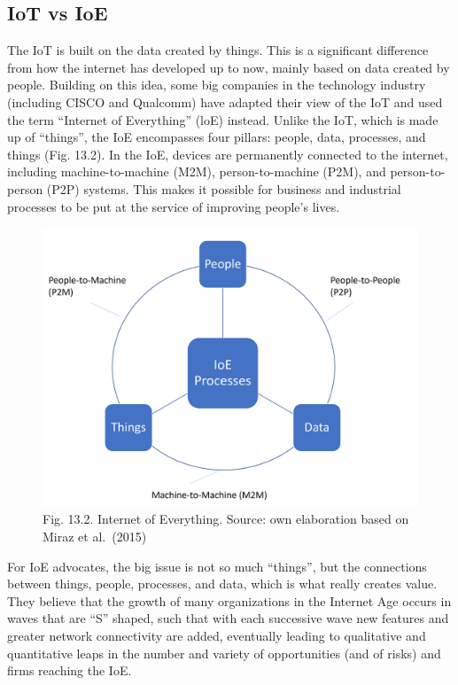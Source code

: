 \documentclass[
  letterpaper,
  DIV=11,
  numbers=noendperiod]{scrreprt}
\begin{document}
\hypertarget{iot-vs-ioe}{%
\subsection{IoT vs IoE}\label{iot-vs-ioe}}

The IoT is built on the data created by things. This is a significant
difference from how the internet has developed up to now, mainly based
on data created by people. Building on this idea, some big companies in
the technology industry (including CISCO and Qualcomm) have adapted
their view of the IoT and used the term ``Internet of Everything'' (loE)
instead. Unlike the IoT, which is made up of ``things'', the IoE
encompasses four pillars: people, data, processes, and things (Fig.
13.2). In the IoE, devices are permanently connected to the internet,
including machine-to-machine (M2M), person-to-machine (P2M), and
person-to-person (P2P) systems. This makes it possible for business and
industrial processes to be put at the service of improving people's
lives.

\begin{figure}

{\centering \includegraphics[width=6.25in,height=\textheight]{img/fig17.png}

}

\caption{Fig. 13.2. Internet of Everything. Source: own elaboration
based on Miraz et al.~(2015)}

\end{figure}

For IoE advocates, the big issue is not so much ``things'', but the
connections between things, people, processes, and data, which is what
really creates value. They believe that the growth of many organizations
in the Internet Age occurs in waves that are ``S'' shaped, such that
with each successive wave new features and greater network connectivity
are added, eventually leading to qualitative and quantitative leaps in
the number and variety of opportunities (and of risks) and firms
reaching the IoE.
\end{document}

